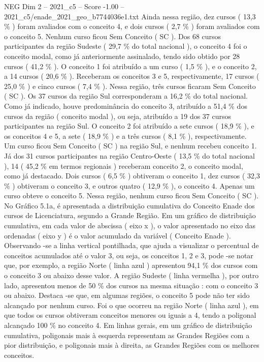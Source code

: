 \begin{textsample}{NEG Dim 2 – 2021\_c5 – Score -1.00 – 2021\_c5/enade\_2021\_geo\_b7744036e1.txt}
Ainda nessa região, dez cursos ( 13,3 \% ) foram avaliados com o conceito 4, e dois cursos ( 2,7 \% ) foram avaliados com o conceito 5.
Nenhum curso ficou Sem Conceito ( SC ).
Dos 68 cursos participantes da região Sudeste ( 29,7 \% do total nacional ), o conceito 4 foi o conceito modal, como já anteriormente assinalado, tendo sido obtido por 28 cursos ( 41,2 \% ).
O conceito 1 foi atribuído a um curso ( 1,5 \% ), e o conceito 2, a 14 cursos ( 20,6 \% ).
Receberam os conceitos 3 e 5, respectivamente, 17 cursos ( 25,0 \% ) e cinco cursos ( 7,4 \% ).
Nessa região, três cursos ficaram Sem Conceito ( SC ).
Os 37 cursos da região Sul corresponderam a 16,2 \% do total nacional.
Como já indicado, houve predominância do conceito 3, atribuído a 51,4 \% dos cursos da região ( conceito modal ), ou seja, atribuído a 19 dos 37 cursos participantes na região Sul.
O conceito 2 foi atribuído a sete cursos ( 18,9 \% ), e os conceitos 4 e 5, a sete ( 18,9 \% ) e a três cursos ( 8,1 \% ), respectivamente.
Um curso ficou Sem Conceito ( SC ) na região Sul, e nenhum recebeu conceito 1.
Já dos 31 cursos participantes na região Centro-Oeste ( 13,5 \% do total nacional ), 14 ( 45,2 \% em termos regionais ) receberam conceito 2, o conceito modal, como já destacado.
Dois cursos ( 6,5 \% ) obtiveram o conceito 1, dez cursos ( 32,3 \% ) obtiveram o conceito 3, e outros quatro ( 12,9 \% ), o conceito 4.
Apenas um curso obteve o conceito 5.
Nessa região, nenhum curso ficou Sem Conceito ( SC ).
No Gráfico 5.1a, é apresentada a distribuição cumulativa do Conceito Enade dos cursos de Licenciatura, segundo a Grande Região.
Em um gráfico de distribuição cumulativa, em cada valor de abscissa ( eixo x ), o valor apresentado no eixo das ordenadas ( eixo y ) é o valor acumulado da variável ( Conceito Enade ).
Observando -se a linha vertical pontilhada, que ajuda a visualizar o percentual de conceitos acumulados até o valor 3, ou seja, os conceitos 1, 2 e 3, pode -se notar que, por exemplo, a região Norte ( linha azul ) apresentou 94,1 \% dos cursos com o conceito 3 ou abaixo desse valor.
A região Sudeste ( linha vermelha ), por outro lado, apresentou menos de 50 \% dos cursos na mesma situação : com o conceito 3 ou abaixo.
Destaca -se que, em algumas regiões, o conceito 5 pode não ter sido alcançado por nenhum curso.
Foi o que ocorreu na região Norte ( linha azul ), em que todos os cursos obtiveram conceitos menores ou iguais a 4, tendo a poligonal alcançado 100 \% no conceito 4.
Em linhas gerais, em um gráfico de distribuição cumulativa, poligonais mais à esquerda representam as Grandes Regiões com a pior distribuição, e poligonais mais à direita, as Grandes Regiões com os melhores conceitos.

\end{textsample}
